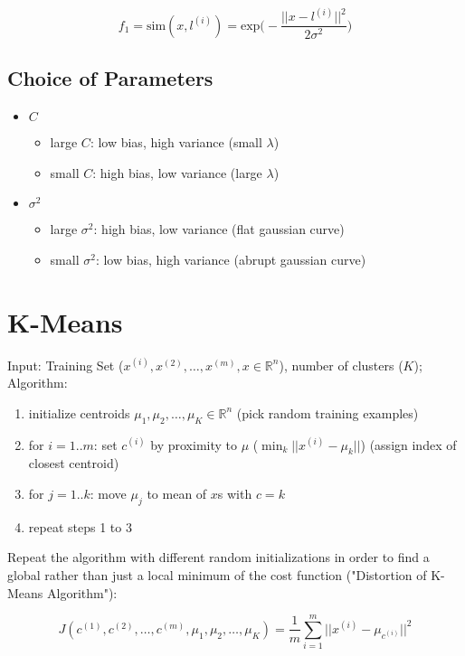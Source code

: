 \documentclass[a4paper,11pt]{scrartcl}
\begin{document}
$$ f_1 = \text{sim}(x,l^{(i)}) = \text{exp}\Bigg( - \frac{|| x - l^{(i)} ||^2}{2\sigma^2} \Bigg) $$

\subsection{Choice of Parameters}

\begin{itemize}
    \item{$C$}
        \begin{itemize}
            \item large $C$: low bias, high variance (small $\lambda$)
            \item small $C$: high bias, low variance (large $\lambda$)
        \end{itemize}
    \item{$\sigma^2$}
        \begin{itemize}
            \item large $\sigma^2$: high bias, low variance (flat gaussian curve)
            \item small $\sigma^2$: low bias, high variance (abrupt gaussian curve)
        \end{itemize}
\end{itemize}

\section{K-Means}

Input: Training Set ($x^{(i)}, x^{(2)}, \dots, x^{(m)}, x \in \mathbb{R}^n$), number of clusters ($K$); Algorithm:

\begin{enumerate}
    \item initialize centroids $\mu_1,\mu_2,\dots,\mu_K \in \mathbb{R}^n$ (pick random training examples)
    \item for $i=1..m$: set $c^{(i)}$ by proximity to $\mu$ ($\displaystyle\min_{k} || x^{(i)} - \mu_{k} ||$) (assign index of closest centroid)
    \item for $j=1..k$: move $\mu_j$ to mean of $x$s with $c=k$
    \item repeat steps 1 to 3
\end{enumerate}

Repeat the algorithm with different random initializations in order to find a global rather than just a local minimum of the cost function ("Distortion of K-Means Algorithm"):

$$ J(c^{(1)},c^{(2)},\dots,c^{(m)},\mu_1,\mu_2,\dots,\mu_K) = \frac{1}{m} \sum_{i=1}^{m} || x^{(i)} - \mu_{c^{(i)}} ||^2 $$
\end{document}
